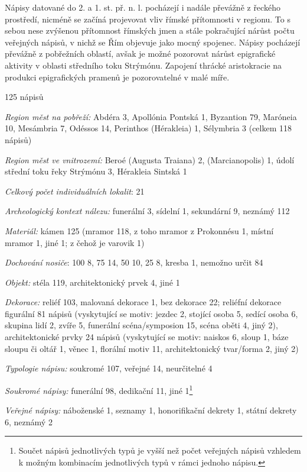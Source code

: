 Nápisy datované do 2. a 1. st. př. n. l. pocházejí i nadále převážně z řeckého prostředí, nicméně se začíná projevovat vliv římské přítomnosti v regionu. To s sebou nese zvýšenou přítomnost římských jmen a stále pokračující nárůst počtu veřejných nápisů, v nichž se Řím objevuje jako mocný spojenec. Nápisy pocházejí převážně z pobřežních oblastí, avšak je možné pozorovat nárůst epigrafické aktivity v oblasti středního toku Strýmónu. Zapojení thrácké aristokracie na produkci epigrafických pramenů je pozorovatelné v malé míře.

\placetable[none]{}
\starttable[|l|]
\HL
{} 125 nápisů

{\em Region měst na pobřeží:} Abdéra 3, Apollónia Pontská 1, Byzantion 79, Maróneia 10, Mesámbria 7, Odéssos 14, Perinthos (Hérakleia) 1, Sélymbria 3 (celkem 118 nápisů)

{\em Region měst ve vnitrozemí:} Beroé (Augusta Traiana) 2, (Marcianopolis) 1, údolí střední toku řeky Strýmónu 3, Hérakleia Sintská 1

{\em Celkový počet individuálních lokalit}: 21

{\em Archeologický kontext nálezu:} funerální 3, sídelní 1, sekundární 9, neznámý 112

{\em Materiál:} kámen 125 (mramor 118, z toho mramor z Prokonnésu 1, místní mramor 1, jiné 1; z čehož je varovik 1)

{\em Dochování nosiče}: 100  8, 75  14, 50  10, 25  8, kresba 1, nemožno určit 84

{\em Objekt:} stéla 119, architektonický prvek 4, jiné 1

{\em Dekorace:} reliéf 103, malovaná dekorace 1, bez dekorace 22; reliéfní dekorace figurální 81 nápisů (vyskytující se motiv: jezdec 2, stojící osoba 5, sedící osoba 6, skupina lidí 2, zvíře 5, funerální scéna/symposion 15, scéna oběti 4, jiný 2), architektonické prvky 24 nápisů (vyskytující se motiv: naiskos 6, sloup 1, báze sloupu či oltář 1, věnec 1, florální motiv 11, architektonický tvar/forma 2, jiný 2)

{\em Typologie nápisu:} soukromé 107, veřejné 14, neurčitelné 4

{\em Soukromé nápisy:} funerální 98, dedikační 11, jiné 1\footnote{Součet nápisů jednotlivých typů je vyšší než počet veřejných nápisů vzhledem k možným kombinacím jednotlivých typů v rámci jednoho nápisu.}

{\em Veřejné nápisy:} náboženské 1, seznamy 1, honorifikační dekrety 1, státní dekrety 6, neznámý 2

